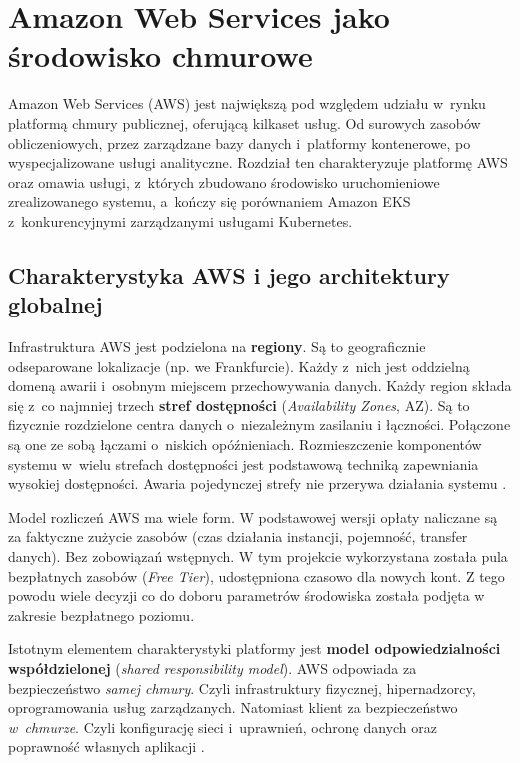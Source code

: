 \chapter{Amazon Web Services jako środowisko chmurowe}
\label{chap:aws}

Amazon Web Services (AWS) jest największą pod względem udziału w~rynku platformą chmury publicznej, oferującą
kilkaset usług. Od surowych zasobów obliczeniowych, przez zarządzane bazy danych i~platformy kontenerowe, po
wyspecjalizowane usługi analityczne. Rozdział ten charakteryzuje platformę AWS oraz omawia usługi, z~których
zbudowano środowisko uruchomieniowe zrealizowanego systemu, a~kończy się porównaniem Amazon EKS z~konkurencyjnymi
zarządzanymi usługami Kubernetes.

\section{Charakterystyka AWS i jego architektury globalnej}
\label{sec:charakterystyka-aws}

Infrastruktura AWS jest podzielona na \textbf{regiony}. Są to geograficznie odseparowane lokalizacje (np.  we Frankfurcie).
Każdy z~nich jest oddzielną domeną awarii i~osobnym miejscem przechowywania danych. Każdy region składa się
z~co najmniej trzech \textbf{stref dostępności} (\emph{Availability Zones}, AZ). Są to fizycznie rozdzielone 
centra danych o~niezależnym zasilaniu i łączności. Połączone są one ze sobą łączami o~niskich opóźnieniach.
Rozmieszczenie komponentów systemu w~wielu strefach dostępności jest podstawową techniką zapewniania
wysokiej dostępności. Awaria pojedynczej strefy nie przerywa działania systemu \parencite{awsdocs}.

Model rozliczeń AWS ma wiele form. W podstawowej wersji opłaty naliczane są za faktyczne zużycie zasobów
(czas działania instancji, pojemność, transfer danych). Bez zobowiązań wstępnych. W tym projekcie wykorzystana
została pula bezpłatnych zasobów (\emph{Free Tier}), udostępniona czasowo dla nowych kont. Z tego powodu
wiele decyzji co do doboru parametrów środowiska została podjęta w zakresie bezpłatnego poziomu.

Istotnym elementem charakterystyki platformy jest \textbf{model odpowiedzialności współdzielonej} (\emph{shared
responsibility model}). AWS odpowiada za bezpieczeństwo \emph{samej chmury}. Czyli infrastruktury fizycznej, hipernadzorcy,
oprogramowania usług zarządzanych. Natomiast klient za bezpieczeństwo \emph{w~chmurze}. Czyli konfigurację sieci
i~uprawnień, ochronę danych oraz poprawność własnych aplikacji \parencite{awsdocs}.

